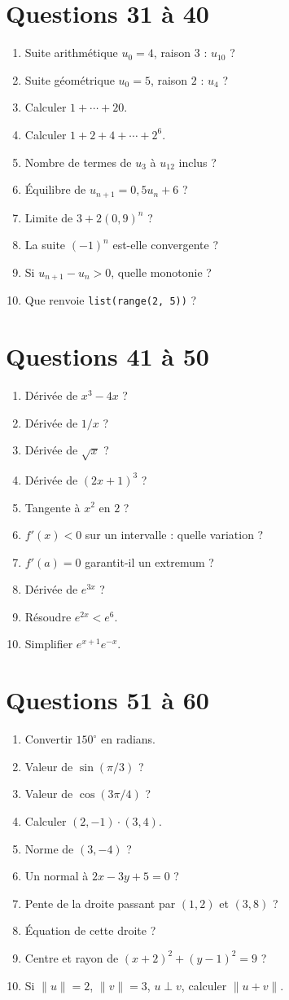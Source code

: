 \documentclass[11pt,a4paper,oneside]{book}
\begin{document}
\section{Questions 31 à 40}
\begin{enumerate}[start=31]
\item Suite arithmétique $u_0=4$, raison $3$ : $u_{10}$ ?
\item Suite géométrique $u_0=5$, raison $2$ : $u_4$ ?
\item Calculer $1+\cdots+20$.
\item Calculer $1+2+4+\cdots+2^6$.
\item Nombre de termes de $u_3$ à $u_{12}$ inclus ?
\item Équilibre de $u_{n+1}=0{,}5u_n+6$ ?
\item Limite de $3+2(0{,}9)^n$ ?
\item La suite $(-1)^n$ est-elle convergente ?
\item Si $u_{n+1}-u_n>0$, quelle monotonie ?
\item Que renvoie \texttt{list(range(2, 5))} ?
\end{enumerate}
\section{Questions 41 à 50}
\begin{enumerate}[start=41]
\item Dérivée de $x^3-4x$ ?
\item Dérivée de $1/x$ ?
\item Dérivée de $\sqrt x$ ?
\item Dérivée de $(2x+1)^3$ ?
\item Tangente à $x^2$ en $2$ ?
\item $f'(x)<0$ sur un intervalle : quelle variation ?
\item $f'(a)=0$ garantit-il un extremum ?
\item Dérivée de $e^{3x}$ ?
\item Résoudre $e^{2x}<e^6$.
\item Simplifier $e^{x+1}e^{-x}$.
\end{enumerate}
\section{Questions 51 à 60}
\begin{enumerate}[start=51]
\item Convertir $150^\circ$ en radians.
\item Valeur de $\sin(\pi/3)$ ?
\item Valeur de $\cos(3\pi/4)$ ?
\item Calculer $(2,-1)\cdot(3,4)$.
\item Norme de $(3,-4)$ ?
\item Un normal à $2x-3y+5=0$ ?
\item Pente de la droite passant par $(1,2)$ et $(3,8)$ ?
\item Équation de cette droite ?
\item Centre et rayon de $(x+2)^2+(y-1)^2=9$ ?
\item Si $\|u\|=2$, $\|v\|=3$, $u\perp v$, calculer $\|u+v\|$.
\end{enumerate}
\end{document}
